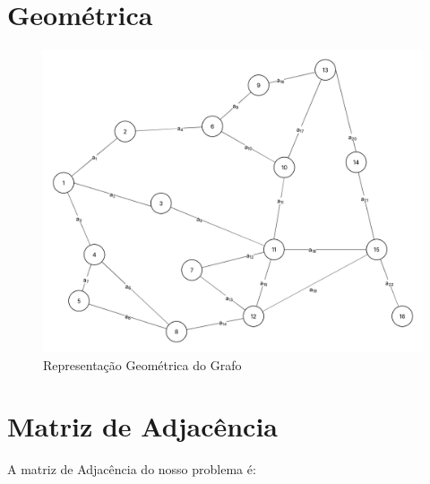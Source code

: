 \documentclass[
12pt,
a4paper,
semrecuonosumario,
sumario = abnt-6027-2012]{report}
\begin{document}
	\section{Geométrica}\label{sec:geometrica}
	\begin{figure}[!htb]%
	\caption{Representação Geométrica do Grafo}%
		\label{fig:grafGeometrico}%
		\includegraphics[width=1\textwidth,angle=0]{figuras/grafoGeometrico.png}%
	\end{figure}


	\section{Matriz de Adjacência}\label{sec:matriz}

	A matriz de Adjacência do nosso problema é:
\end{document}
